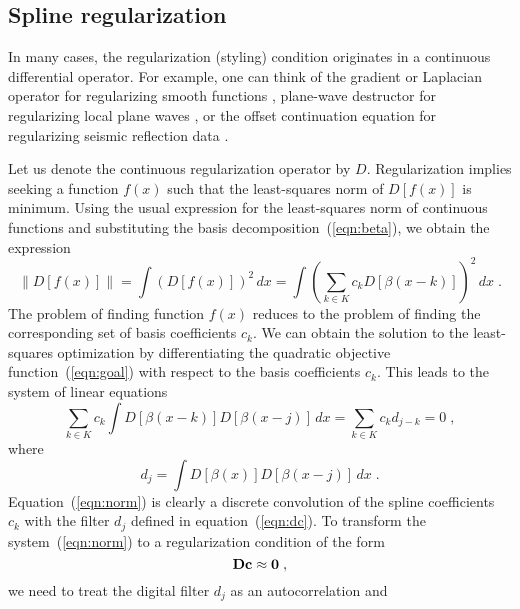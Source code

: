 \subsection{Spline regularization}

In many cases, the regularization (styling) condition originates in a
continuous differential operator. For example, one can think of the
gradient or Laplacian operator for regularizing smooth functions
\cite{Fomel.sep.103.sergey1}, plane-wave destructor for regularizing
local plane waves \cite{Fomel.sep.105.sergey1}, or the offset
continuation equation for regularizing seismic reflection data
\cite{Fomel.sep.103.sergey2}. 
\par
Let us denote the continuous regularization operator by $D$.
Regularization implies seeking a function $f(x)$ such that the
least-squares norm of $D\left[f(x)\right]$ is minimum. Using the usual
expression for the least-squares norm of continuous functions and
substituting the basis decomposition~(\ref{eqn:beta}), we obtain 
the expression
\begin{equation}
  \label{eqn:goal}
  \left\|D\left[f(x)\right]\right\| = 
  \int \left(D\left[f(x)\right]\right)^2\,dx =
  \int \left(\sum_{k \in K} c_k D\left[ \beta (x-k)\right]\right)^2\,dx\;.
\end{equation}
The problem of finding function $f(x)$ reduces to the problem of
finding the corresponding set of basis coefficients $c_k$. We can
obtain the solution to the least-squares optimization by
differentiating the quadratic objective function~(\ref{eqn:goal}) with
respect to the basis coefficients $c_k$. This leads to the system of
linear equations
\begin{equation}
  \label{eqn:norm}
  \sum_{k \in K} c_k \int D \left[\beta (x-k)\right] 
  D\left[\beta (x-j)\right] \,dx = 
  \sum_{k \in K} c_k d_{j-k} = 0\;,
\end{equation}
where
\begin{equation}
\label{eqn:dc}
d_j = \int D\left[\beta (x)\right] D\left[\beta (x-j)\right]\,dx\;.
\end{equation}
Equation~(\ref{eqn:norm}) is clearly a discrete convolution of the
spline coefficients~$c_k$ with the filter $d_j$ defined in
equation~(\ref{eqn:dc}). To transform the system~(\ref{eqn:norm}) to a
regularization condition of the form
\begin{equation}
  \label{eqn:dtd}
  \bold{D c} \approx \bold{0}\;,
\end{equation}
we need to treat the digital filter $d_j$ as an autocorrelation and
